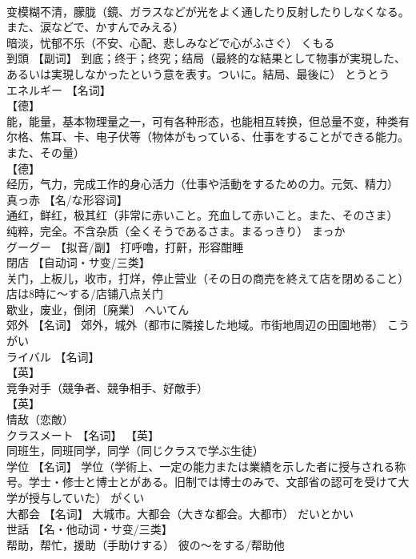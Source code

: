\documentclass[8pt]{extreport}
\begin{document}
\begin{CJK}{UTF8}{min}
\\	变模糊不清，朦胧（鏡、ガラスなどが光をよく通したり反射したりしなくなる。また、涙などで、かすんでみえる） 
\\	暗淡，忧郁不乐（不安、心配、悲しみなどで心がふさぐ）	くもる	
\\	到頭	【副词】 到底；终于；终究；结局（最終的な結果として物事が実現した、あるいは実現しなかったという意を表す。ついに。結局、最後に）	とうとう	
\\	エネルギー	【名词】 
\\	【德】
\\	能，能量，基本物理量之一，可有各种形态，也能相互转换，但总量不变，种类有尔格、焦耳、卡、电子伏等（物体がもっている、仕事をすることができる能力。また、その量） 
\\	【德】
\\	经历，气力，完成工作的身心活力（仕事や活動をするための力。元気、精力）		
\\	真っ赤	【名/な形容词】 
\\	通红，鲜红，极其红（非常に赤いこと。充血して赤いこと。また、そのさま） 
\\	纯粹，完全。不含杂质（全くそうであるさま。まるっきり）	まっか	
\\	グーグー	【拟音/副】 打呼噜，打鼾，形容酣睡		
\\	閉店	【自动词・サ变/三类】 
\\	关门，上板儿，收市，打烊，停止营业（その日の商売を終えて店を閉めること） 店は8時に～する/店铺八点关门 
\\	歇业，废业，倒闭〔廃業〕	へいてん	
\\	郊外	【名词】 郊外，城外（都市に隣接した地域。市街地周辺の田園地帯）	こうがい	
\\	ライバル	【名词】 
\\	【英】
\\	竞争对手（競争者、競争相手、好敵手） 
\\	【英】
\\	情敌（恋敵）		
\\	クラスメート	【名词】 【英】
\\	同班生，同班同学，同学（同じクラスで学ぶ生徒）		
\\	学位	【名词】 学位（学術上、一定の能力または業績を示した者に授与される称号。学士・修士と博士とがある。旧制では博士のみで、文部省の認可を受けて大学が授与していた）	がくい	
\\	大都会	【名词】 大城市。大都会（大きな都会。大都市）	だいとかい	
\\	世話	【名・他动词・サ变/三类】 
\\	帮助，帮忙，援助（手助けする） 彼の～をする/帮助他 

\end{CJK}
\end{document}
